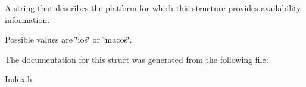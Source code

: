 A string that describes the platform for which this structure provides availability information. 

Possible values are \char`\"{}ios\char`\"{} or \char`\"{}macos\char`\"{}. 

The documentation for this struct was generated from the following file\+:\begin{DoxyCompactItemize}
\item 
Index.\+h\end{DoxyCompactItemize}
